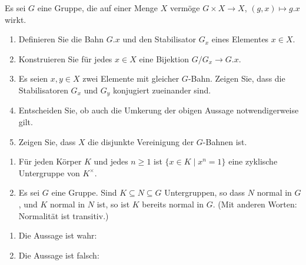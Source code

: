 \begin{question}
  Es sei $G$ eine Gruppe, die auf einer Menge $X$ vermöge $G \times X \to X$, $(g,x) \mapsto g.x$ wirkt.
  \begin{enumerate}
    \item
      Definieren Sie die Bahn $G.x$ und den Stabilisator $G_x$ eines Elementes $x \in X$.
    \item
      Konstruieren Sie für jedes $x \in X$ eine Bijektion $G/G_x \to G.x$.
    \item
      Es seien $x, y \in X$ zwei Elemente mit gleicher $G$-Bahn.
      Zeigen Sie, dass die Stabilisatoren $G_x$ und $G_y$ konjugiert zueinander sind.
    \item
      Entscheiden Sie, ob auch die Umkerung der obigen Aussage notwendigerweise gilt.
    \item
      Zeigen Sie, dass $X$ die disjunkte Vereinigung der $G$-Bahnen ist.
  \end{enumerate}
\end{question}




\begin{question}[subtitle = Multiple Choice]
  \begin{enumerate}
    \item
      Für jeden Körper $K$ und jedes $n \geq 1$ ist $\{x \in K \mid x^n = 1\}$ eine zyklische Untergruppe von $K^\times$.
    \item
      Es sei $G$ eine Gruppe.
      Sind $K \subseteq N \subseteq G$ Untergruppen, so dass $N$ normal in $G$, und $K$ normal in $N$ ist, so ist $K$ bereits normal in $G$.
      (Mit anderen Worten:
       Normalität ist transitiv.)
  \end{enumerate}
\end{question}


\begin{solution}
  \begin{enumerate}
    \item
      Die Aussage ist wahr:
    \item
      Die Aussage ist falsch:
  \end{enumerate}
\end{solution}


